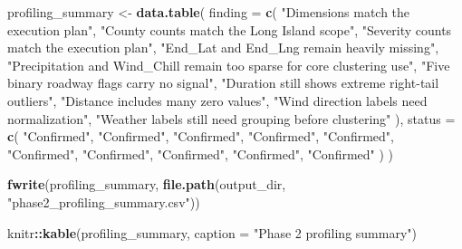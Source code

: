 \documentclass[
]{article}
\newenvironment{Shaded}{\begin{snugshade}}{\end{snugshade}}
\newcommand{\AttributeTok}[1]{\textcolor[rgb]{0.13,0.29,0.53}{#1}}
\newcommand{\FunctionTok}[1]{\textcolor[rgb]{0.13,0.29,0.53}{\textbf{#1}}}
\newcommand{\NormalTok}[1]{#1}
\newcommand{\OtherTok}[1]{\textcolor[rgb]{0.56,0.35,0.01}{#1}}
\newcommand{\SpecialCharTok}[1]{\textcolor[rgb]{0.81,0.36,0.00}{\textbf{#1}}}
\newcommand{\StringTok}[1]{\textcolor[rgb]{0.31,0.60,0.02}{#1}}
\begin{document}
\begin{Shaded}
\begin{Highlighting}[]
\NormalTok{profiling\_summary }\OtherTok{\textless{}{-}} \FunctionTok{data.table}\NormalTok{(}
  \AttributeTok{finding =} \FunctionTok{c}\NormalTok{(}
    \StringTok{"Dimensions match the execution plan"}\NormalTok{,}
    \StringTok{"County counts match the Long Island scope"}\NormalTok{,}
    \StringTok{"Severity counts match the execution plan"}\NormalTok{,}
    \StringTok{"End\_Lat and End\_Lng remain heavily missing"}\NormalTok{,}
    \StringTok{"Precipitation and Wind\_Chill remain too sparse for core clustering use"}\NormalTok{,}
    \StringTok{"Five binary roadway flags carry no signal"}\NormalTok{,}
    \StringTok{"Duration still shows extreme right{-}tail outliers"}\NormalTok{,}
    \StringTok{"Distance includes many zero values"}\NormalTok{,}
    \StringTok{"Wind direction labels need normalization"}\NormalTok{,}
    \StringTok{"Weather labels still need grouping before clustering"}
\NormalTok{  ),}
  \AttributeTok{status =} \FunctionTok{c}\NormalTok{(}
    \StringTok{"Confirmed"}\NormalTok{,}
    \StringTok{"Confirmed"}\NormalTok{,}
    \StringTok{"Confirmed"}\NormalTok{,}
    \StringTok{"Confirmed"}\NormalTok{,}
    \StringTok{"Confirmed"}\NormalTok{,}
    \StringTok{"Confirmed"}\NormalTok{,}
    \StringTok{"Confirmed"}\NormalTok{,}
    \StringTok{"Confirmed"}\NormalTok{,}
    \StringTok{"Confirmed"}\NormalTok{,}
    \StringTok{"Confirmed"}
\NormalTok{  )}
\NormalTok{)}

\FunctionTok{fwrite}\NormalTok{(profiling\_summary, }\FunctionTok{file.path}\NormalTok{(output\_dir, }\StringTok{"phase2\_profiling\_summary.csv"}\NormalTok{))}

\NormalTok{knitr}\SpecialCharTok{::}\FunctionTok{kable}\NormalTok{(profiling\_summary, }\AttributeTok{caption =} \StringTok{"Phase 2 profiling summary"}\NormalTok{)}
\end{Highlighting}
\end{Shaded}
\end{document}
